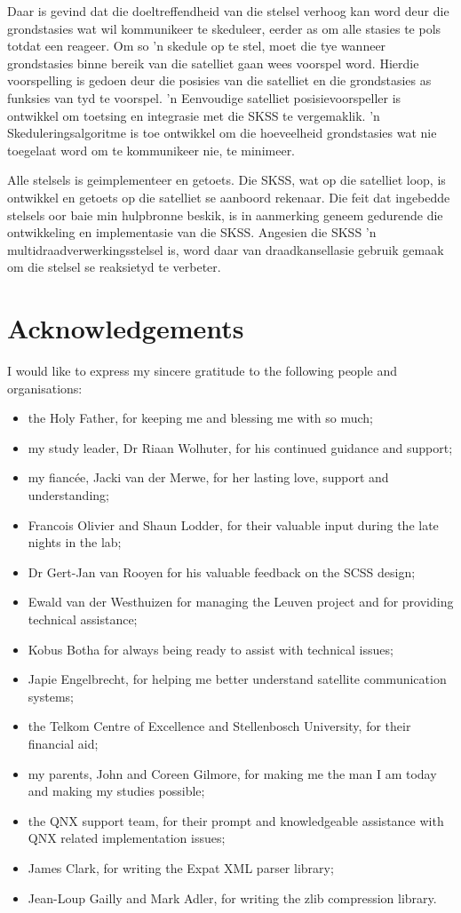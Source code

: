 Daar is gevind dat die doeltreffendheid van die stelsel verhoog kan word deur die
grondstasies wat wil kommunikeer te skeduleer, eerder as om alle stasies
te pols totdat een reageer. Om so 'n skedule op te stel, moet die tye
wanneer grondstasies binne bereik van die satelliet gaan wees voorspel
word. Hierdie voorspelling is gedoen deur die posisies van die
satelliet en die grondstasies as funksies van tyd te voorspel. 'n
Eenvoudige satelliet posisievoorspeller is ontwikkel om toetsing en
integrasie met die SKSS te vergemaklik. 'n Skeduleringsalgoritme is toe
ontwikkel om die hoeveelheid grondstasies wat nie toegelaat word om te
kommunikeer nie, te minimeer.

Alle stelsels is geimplementeer en getoets. Die SKSS, wat op die
satelliet loop, is ontwikkel en getoets op die satelliet se aanboord
rekenaar. Die feit dat ingebedde stelsels oor baie min hulpbronne beskik,
is in aanmerking geneem gedurende die ontwikkeling en implementasie van die SKSS.
Angesien die SKSS 'n multidraadverwerkingsstelsel is, word daar van
draadkansellasie gebruik gemaak om die stelsel se reaksietyd te verbeter.


\chapter{Acknowledgements}%

I would like to express my sincere gratitude to the following people and organisations:
\begin{itemize}
  \item the Holy Father, for keeping me and blessing me with so much;
  \item my study leader, Dr Riaan Wolhuter, for his continued guidance and support;
  \item my fianc\'{e}e, Jacki van der Merwe, for her lasting love, support and understanding;
  \item Francois Olivier and Shaun Lodder, for their valuable input during the late nights in the lab;
  \item Dr Gert-Jan van Rooyen for his valuable feedback on the SCSS design;
  \item Ewald van der Westhuizen for managing the Leuven project and for providing technical assistance;
  \item Kobus Botha for always being ready to assist with technical issues;
  \item Japie Engelbrecht, for helping me better understand satellite communication systems;
  \item the Telkom Centre of Excellence and Stellenbosch University, for their financial aid;
  \item my parents, John and Coreen Gilmore, for making me the man I am today and making
  my studies possible;
  \item the QNX support team, for their prompt and knowledgeable assistance with QNX related implementation issues;
  \item James Clark, for writing the Expat XML parser library;
  \item Jean-Loup Gailly and Mark Adler, for writing the zlib compression library.
\end{itemize}


